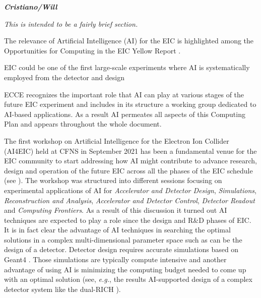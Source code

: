 \textbf{\emph{Cristiano/Will}}

\emph{This is intended to be a fairly brief section. %
}


The relevance of Artificial Intelligence (AI) for the EIC is highlighted among the Opportunities for Computing in the EIC Yellow Report \cite{eic_yellow_report_v1_1}.

EIC 
could be one of the first large-scale experiments where AI is systematically employed from the detector and design 

ECCE recognizes the important role that AI can play at various stages of the future EIC experiment and includes in its structure a working group dedicated to AI-based applications. 
As a result AI permeates all aspects of this Computing Plan and appears throughout the whole document.

The first workshop on Artificial Intelligence for the Electron Ion Collider (AI4EIC) held at CFNS in September 2021 \cite{AI4EIC_workshop} has been a fundamental venue for the EIC community to start addressing how AI might contribute to advance research, design and operation of the future EIC across all the phases of the EIC schedule (see \cite{AI4EIC_future}).
The workshop was structured into different sessions focusing on experimental applications of AI for \textit{Accelerator and Detector Design}, \textit{Simulations}, \textit{Reconstruction and Analysis}, \textit{Accelerator and Detector Control}, \textit{Detector Readout} and \textit{Computing Frontiers}. 
%
As a result of this discussion it turned out AI techniques are expected to play a role since the design and R\&D phases of EIC. 
It is in fact clear the advantage of AI techniques in searching the optimal solutions in a complex multi-dimensional parameter space such as can be the design of a detector. Detector design requires accurate simulations based on Geant4 \cite{ALLISON2016186}. Those simulations are typically compute intensive and another advantage of using AI is minimizing the computing budget needed to come up with an optimal solution (see, \textit{e.g.}, the results AI-supported design of a complex detector system like the dual-RICH \cite{cisbani2020ai}).


